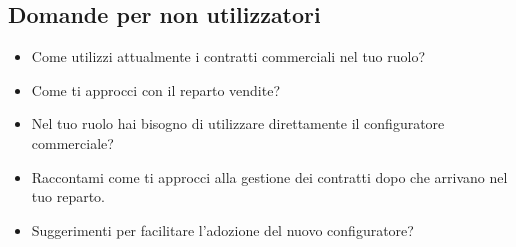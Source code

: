 \subsection{Domande per non utilizzatori}
\begin{itemize}
    \item Come utilizzi attualmente i contratti commerciali nel tuo ruolo?
    \item Come ti approcci con il reparto vendite?
    \item Nel tuo ruolo hai bisogno di utilizzare direttamente il configuratore
          commerciale?
    \item Raccontami come ti approcci alla gestione dei contratti dopo che arrivano nel
          tuo reparto.
    \item Suggerimenti per facilitare l'adozione del nuovo configuratore?
\end{itemize}